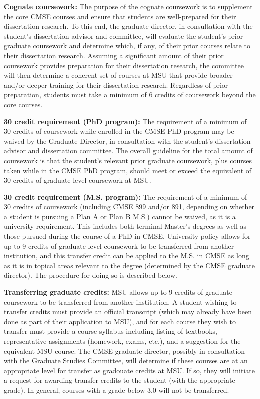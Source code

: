 \vspace{2mm}
\noindent
\textbf{Cognate coursework:} The purpose of the cognate coursework is
to supplement the core CMSE courses and ensure that students are
well-prepared for their dissertation research.  To this end, the
graduate director, in consultation with the student’s dissertation
advisor and committee, will evaluate the student’s prior graduate
coursework and determine which, if any, of their prior courses relate
to their dissertation research.  Assuming a significant amount of
their prior coursework provides preparation for their dissertation
research, the committee will then determine a coherent set of courses
at MSU that provide broader and/or deeper training for their
dissertation research.  Regardless of prior preparation, students must
take a minimum of 6 credits of coursework beyond the core courses.

\vspace{2mm}
\noindent
\textbf{30 credit requirement (PhD program):} The requirement of a minimum of 30
credits of coursework while enrolled in the CMSE PhD program may be
waived by the Graduate Director, in consultation with the student's
dissertation advisor and dissertation committee.  The overall
guideline for the total amount of coursework is that the student's
relevant prior graduate coursework, plus courses taken while in the
CMSE PhD program, should meet or exceed the equivalent of 30 credits
of graduate-level coursework at MSU. 

\vspace{2mm}
\noindent
\textbf{30 credit requirement (M.S. program):}  The requirement of a
minimum of 30 credits of coursework (including CMSE 899 and/or 891,
depending on whether a student is pursuing a Plan A or Plan B M.S.)
cannot be waived, as it is a university requirement.  This includes
both terminal Master's degrees as well as those pursued during the
course of a PhD in CMSE.  University policy allows for up to 9 credits of graduate-level coursework
to be transferred from another institution, and this transfer credit
can be applied to the M.S. in
CMSE as long as it is in topical areas relevant to the degree
(determined by the CMSE graduate director).  The procedure for doing so is described below.


\vspace{2mm}
\noindent
\textbf{Transferring graduate credits:}  MSU allows up to 9 credits of
graduate
coursework to be transferred from another institution.  A student
wishing to transfer credits must provide an official transcript (which
may already have been done as part of their application to MSU), and
for each course they wish to transfer must provide a course syllabus
including listing of textbooks, representative assignments (homework,
exams, etc.), and a suggestion for the equivalent MSU course.  The
CMSE graduate director, possibly in consultation with the Graduate
Studies Committee, will determine if these courses are at an
appropriate level for transfer as gradouate credits at MSU.  If so,
they will initiate a request for awarding transfer credits to the
student (with the appropriate grade).  In general, courses with a
grade below 3.0 will not be transferred.


